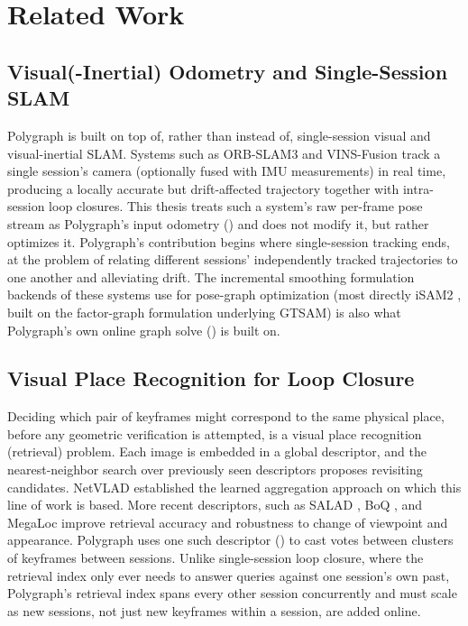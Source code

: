 %

\chapter{Related Work}
\label{chap:relatedwork}

\section{Visual(-Inertial) Odometry and Single-Session SLAM}

Polygraph is built on top of, rather than instead of, single-session visual and
visual-inertial SLAM. Systems such as ORB-SLAM3 \cite{campos2021orbslam3} and VINS-Fusion
\cite{qin2019vinsfusionlocal,qin2019vinsfusionglobal} track a single session's camera (optionally fused with IMU measurements) in real time, producing a locally accurate but drift-affected trajectory
together with intra-session loop closures. This thesis treats such a system's raw per-frame
pose stream as Polygraph's input odometry () and does not
modify it, but rather optimizes it. Polygraph's contribution begins where single-session tracking ends, at the problem of relating different sessions' independently tracked trajectories to one
another and alleviating drift. The incremental smoothing formulation backends of these systems use for pose-graph optimization (most directly iSAM2 \cite{kaess2012isam2}, built on the factor-graph
formulation underlying GTSAM) is also what Polygraph's own online graph solve
() is built on.

\section{Visual Place Recognition for Loop Closure}

Deciding which pair of keyframes might correspond to the same physical place, before any geometric verification is attempted, is a visual place recognition (retrieval) problem. Each image is embedded in a global descriptor, and the nearest-neighbor search over previously seen descriptors proposes revisiting candidates. NetVLAD \cite{arandjelovic2016netvlad} established the learned aggregation approach on which this line of work is based. More recent descriptors, such as SALAD \cite{izquierdo2024salad}, BoQ \cite{alibey2024boq}, and MegaLoc \cite{berton2025megaloc} improve retrieval accuracy and robustness to change of viewpoint and appearance. Polygraph uses one such descriptor () to
cast votes between clusters of keyframes between sessions. Unlike single-session loop closure, where the retrieval index only ever needs to answer queries against one session's own past, Polygraph's retrieval index spans every other session concurrently and must scale as new sessions, not just new keyframes within a session, are added online.

